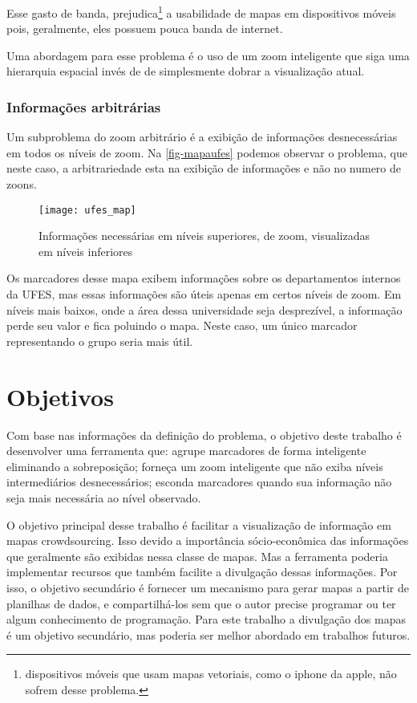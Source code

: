 Esse gasto de banda, prejudica\footnote{dispositivos móveis que usam mapas vetoriais, como o iphone da apple, não sofrem desse problema.} a usabilidade de mapas em dispositivos móveis pois, geralmente, eles possuem pouca banda de internet.

Uma abordagem para esse problema é o uso de um zoom inteligente que siga uma hierarquia espacial invés de de simplesmente dobrar a visualização atual. 

\subsubsection{Informações arbitrárias}
Um subproblema do zoom arbitrário é a exibição de informações desnecessárias em todos os níveis de zoom. Na \autoref{fig-mapaufes} podemos observar o problema, que neste caso, a arbitrariedade esta na exibição de informações e não no numero de zoons. 
 \begin{figure}[htb]
	\caption{\label{fig-mapaufes}Informações necessárias em níveis superiores, de zoom, visualizadas em níveis inferiores}
	\begin{center}
	    \texttt{[image: ufes\_map]}
	\end{center}
\end{figure}
Os marcadores desse mapa exibem informações sobre os departamentos internos da UFES, mas essas informações são úteis apenas em certos níveis de zoom. Em níveis mais baixos, onde a área dessa universidade seja desprezível, a informação perde seu valor e fica poluindo o mapa. Neste caso, um único marcador representando o grupo seria mais útil.

\section{Objetivos}
Com base nas informações da definição do problema, o objetivo deste trabalho é desenvolver uma ferramenta que: agrupe marcadores de forma inteligente eliminando a sobreposição; forneça um zoom inteligente que não exiba níveis intermediários desnecessários; esconda marcadores quando sua informação não seja mais necessária ao nível observado.

O objetivo principal desse trabalho é facilitar a visualização de informação em mapas crowdsourcing. Isso devido a importância sócio-econômica das informações que geralmente são exibidas nessa classe de mapas. Mas a ferramenta poderia implementar recursos que também facilite a divulgação dessas informações. Por isso, o objetivo secundário é fornecer um mecanismo para gerar mapas a partir de planilhas de dados, e compartilhá-los sem que o autor precise programar ou ter algum conhecimento de programação. Para este trabalho a divulgação dos mapas é um objetivo secundário, mas poderia ser melhor abordado em trabalhos futuros.
  
